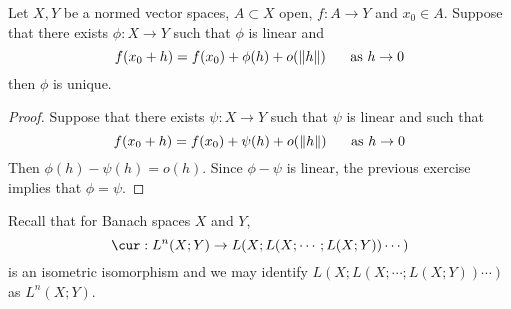 \documentclass{book}
\begin{document}
	\begin{ex} 
	Let $X, Y$ be a normed vector spaces, $A \subset X$ open, $f:A \rightarrow Y$ and $x_0 \in A$. Suppose that there exists $\phi: X \rightarrow Y$ such that $\phi$ is linear and $$f(x_0 + h) = f(x_0) + \phi(h) + o(\|h\| ) \hspace{.5cm} \text{ as } h \rightarrow 0$$ then $\phi$ is unique. 
	\end{ex}
	
	\begin{proof}
	Suppose that there exists $\psi : X \rightarrow Y$ such that $\psi$ is linear and such that
	$$f(x_0 + h) = f(x_0) + \psi(h) + o(\|h\| ) \hspace{.5cm} \text{ as } h \rightarrow 0$$ 
	Then $\phi(h) - \psi(h) = o(h)$. Since $\phi - \psi$ is linear, the previous exercise implies that $\phi = \psi$.
	\end{proof}
	
	\begin{note}
	Recall that for Banach spaces $X$ and $Y$, $$\cur : L^n(X; Y) \rightarrow L(X; L(X; \cdots; L(X; Y)) \cdots)$$ is an  isometric isomorphism and we may identify $L(X; L(X; \cdots; L(X; Y)) \cdots)$ as $L^n(X; Y)$. 
	\end{note}	
	
\end{document}
